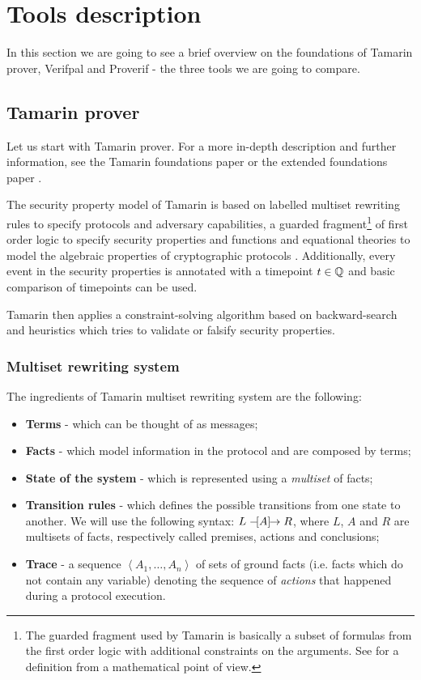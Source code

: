
\section{Tools description}
\label{section:foundations}

In this section we are going to see a brief overview on the foundations of Tamarin prover, Verifpal  and Proverif - the three tools we are going to compare.


\subsection{Tamarin prover}
Let us start with Tamarin prover. For a more
in-depth description and further information, see the Tamarin foundations paper \cite{TamarinFoundations} or the extended foundations paper \cite{TamarinFoundationsExtended}.

The security property model of Tamarin is based on labelled multiset rewriting rules to specify protocols and adversary capabilities, a guarded fragment\footnote{The guarded fragment used by Tamarin is basically a subset of formulas from the first order logic with additional constraints on the arguments. See \cite{FragmentFirstOrderLogicPaper} for a definition from a mathematical point of view.} of first order logic to specify security properties and functions and equational theories to model the algebraic properties of cryptographic protocols \cite{TamarinFoundations}. Additionally, every event in the security properties is annotated with a timepoint $t \in \mathbb{Q}$ and basic comparison of timepoints can be used.

Tamarin then applies a constraint-solving algorithm based on backward-search and heuristics which tries to validate or falsify security properties.

\subsubsection{Multiset rewriting system}
The ingredients of Tamarin multiset rewriting system are the following:

\begin{itemize}
    \item{\textbf{Terms} - which can be thought of as messages;}
    \item{\textbf{Facts} - which model information in the protocol and are composed by terms;}
    \item{\textbf{State of the system} - which is represented using a \textit{multiset} of facts;}
    \item{\textbf{Transition rules} - which defines the possible transitions from one state to another. We will use the following syntax: $L \mathrel{-\hspace{-2pt}[A]\hspace{-4pt}\to} R$, where $L$, $A$ and $R$ are multisets of facts, respectively called premises, actions and conclusions;}
    \item{\textbf{Trace} - a sequence $\left<A_1, \dots, A_n\right>$ of sets of ground facts (i.e. facts which do not contain any variable) denoting the sequence of \textit{actions} that happened during a protocol execution.}
\end{itemize}

